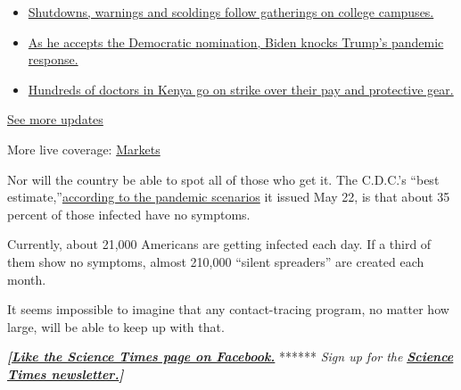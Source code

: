 \begin{itemize}
\tightlist
\item
  \href{https://www.nytimes3xbfgragh.onion/2020/08/21/world/covid-19-coronavirus.html?action=click\&pgtype=Article\&state=default\&region=MAIN_CONTENT_1\&context=storylines_live_updates\#link-4690b6aa}{Shutdowns,
  warnings and scoldings follow gatherings on college campuses.}
\item
  \href{https://www.nytimes3xbfgragh.onion/2020/08/21/world/covid-19-coronavirus.html?action=click\&pgtype=Article\&state=default\&region=MAIN_CONTENT_1\&context=storylines_live_updates\#link-324af071}{As
  he accepts the Democratic nomination, Biden knocks Trump's pandemic
  response.}
\item
  \href{https://www.nytimes3xbfgragh.onion/2020/08/21/world/covid-19-coronavirus.html?action=click\&pgtype=Article\&state=default\&region=MAIN_CONTENT_1\&context=storylines_live_updates\#link-35890b73}{Hundreds
  of doctors in Kenya go on strike over their pay and protective gear.}
\end{itemize}

\href{https://www.nytimes3xbfgragh.onion/2020/08/21/world/covid-19-coronavirus.html?action=click\&pgtype=Article\&state=default\&region=MAIN_CONTENT_1\&context=storylines_live_updates}{See
more updates}

More live coverage:
\href{https://www.nytimes3xbfgragh.onion/live/2020/08/20/business/stock-market-today-coronavirus?action=click\&pgtype=Article\&state=default\&region=MAIN_CONTENT_1\&context=storylines_live_updates}{Markets}

Nor will the country be able to spot all of those who get it. The
C.D.C.'s ``best
estimate,''\href{https://www.cdc.gov/coronavirus/2019-ncov/hcp/planning-scenarios.html}{according
to the pandemic scenarios} it issued May 22, is that about 35 percent of
those infected have no symptoms.

Currently, about 21,000 Americans are getting infected each day. If a
third of them show no symptoms, almost 210,000 ``silent spreaders'' are
created each month.

It seems impossible to imagine that any contact-tracing program, no
matter how large, will be able to keep up with that.

\textbf{\emph{{[}}\href{http://on.fb.me/1paTQ1h}{\emph{Like the Science
Times page on Facebook.}}} ****** \emph{\textbar{} Sign up for the}
\textbf{\href{http://nyti.ms/1MbHaRU}{\emph{Science Times
newsletter.}}\emph{{]}}}

